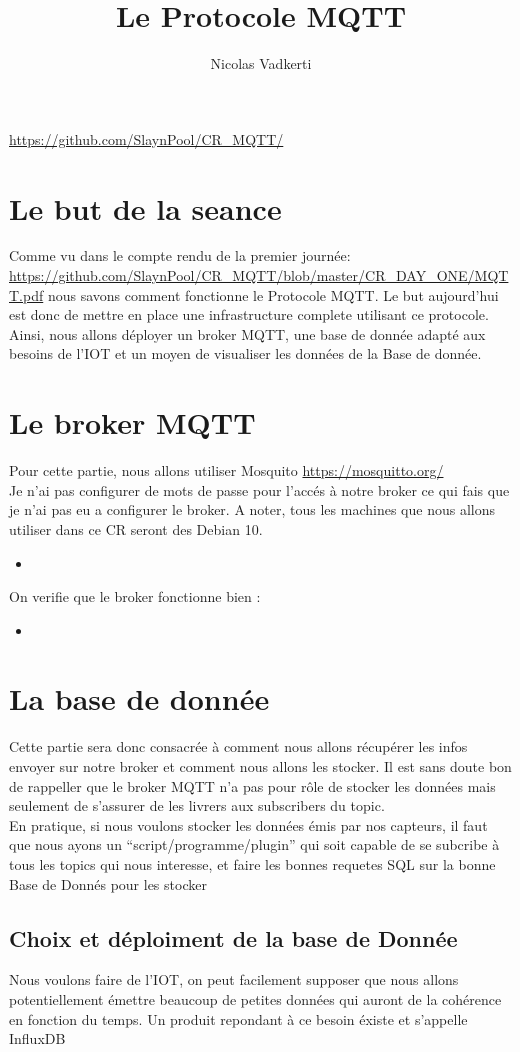 \documentclass[10pt,a4paper]{article}
\title{Le Protocole MQTT}
\author{Nicolas Vadkerti}
\newcommand{\insertcode}[2]{\begin{itemize}\item[]\end{itemize}}
\begin{document}
\maketitle


\url{https://github.com/SlaynPool/CR_MQTT/}


\section{Le but de la seance}
Comme vu dans le compte rendu de la premier journée:
\url{https://github.com/SlaynPool/CR_MQTT/blob/master/CR_DAY_ONE/MQTT.pdf}
nous savons comment fonctionne le Protocole MQTT. Le but aujourd'hui est donc de mettre en place une infrastructure complete utilisant ce protocole.\\
Ainsi, nous allons déployer un broker MQTT, une base de donnée adapté aux besoins de l'IOT et un moyen de visualiser les données de la Base de donnée.
\section{Le broker MQTT}
Pour cette partie, nous allons utiliser Mosquito \url{https://mosquitto.org/}\\
Je n'ai pas configurer de mots de passe pour l'accés à notre broker ce qui fais que je n'ai pas eu a configurer le broker.
A noter,  tous les machines que nous allons utiliser dans ce CR seront des Debian 10.
\insertcode{commande/installBroker.txt}{Installation du broker}
On verifie que le broker fonctionne bien :

 \insertcode{commande/testbroker.txt}{Test du broker}
 
 
 \section{La base de donnée}
 
 Cette partie sera donc consacrée à comment nous allons récupérer les infos envoyer sur notre broker et comment nous allons les stocker. Il est sans doute bon de rappeller que le broker MQTT n'a pas pour rôle de stocker les données mais seulement de s'assurer de les livrers aux subscribers du topic. \\
 En pratique, si nous voulons stocker les données émis par nos capteurs, il faut que nous ayons un ``script/programme/plugin'' qui soit capable de se subcribe à tous les topics qui nous interesse, et faire les bonnes requetes SQL sur la bonne Base de Donnés pour les stocker 
 \subsection{Choix et déploiment de la base de Donnée}
 Nous voulons faire de l'IOT, on peut facilement supposer que nous allons potentiellement émettre beaucoup de petites données qui auront de la cohérence en fonction du temps. Un produit repondant à ce besoin éxiste et s'appelle InfluxDB 
\end{document}
